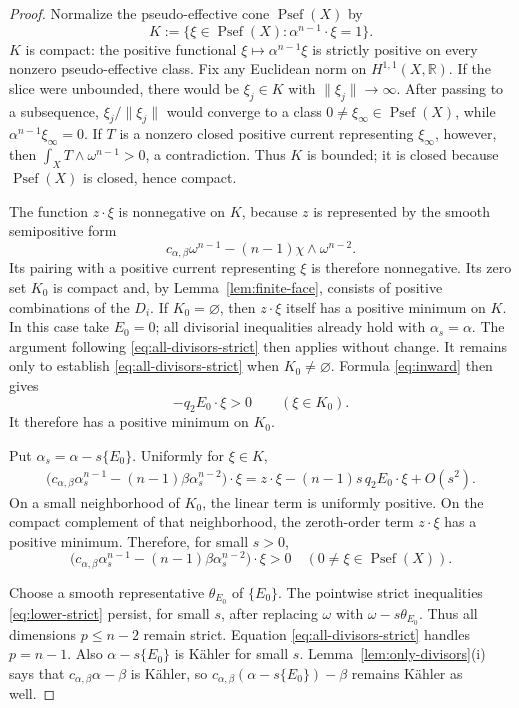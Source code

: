 \documentclass[reqno]{amsart}
\newcommand{\R}{\mathbb{R}}
\newcommand{\Psef}{\operatorname{Psef}}
\newcommand{\cab}{c_{\alpha,\beta}}
\theoremstyle{plain}
\theoremstyle{remark}
\begin{document}
\begin{proof}
Normalize the pseudo-effective cone $\Psef(X)$ by
\[
 K:=\{\xi\in\Psef(X):\alpha^{n-1}\cdot\xi=1\}.
\]
$K$ is compact: the positive functional
$\xi\mapsto\alpha^{n-1}\xi$ is strictly positive on every nonzero
pseudo-effective class.   Fix any Euclidean norm on $H^{1,1}(X,\R)$.  If the slice
were unbounded, there would be $\xi_j\in K$ with
$\|\xi_j\|\to\infty$.  After passing to a subsequence,
$\xi_j/\|\xi_j\|$ would converge to a class
$0\ne\xi_\infty\in\Psef(X)$, while
$\alpha^{n-1}\xi_\infty=0$.  If $T$ is a nonzero closed positive
current representing $\xi_\infty$, however, then
$\int_X T\wedge\omega^{n-1}>0$, a contradiction. Thus $K$ is
bounded; it is closed because $\Psef(X)$ is closed, hence compact.

The function $z\cdot\xi$ is nonnegative on $K$, because $z$ is
represented by the smooth semipositive form
\[
 \cab\omega^{n-1}-(n-1)\chi\wedge\omega^{n-2}.
\]
Its pairing with a positive current representing $\xi$ is therefore
nonnegative. Its zero set $K_0$ is compact and, by
Lemma~\ref{lem:finite-face}, consists of
positive combinations of the $D_i$.
If $K_0=\varnothing$, then $z\cdot\xi$ itself has a positive
minimum on $K$.  In this case take $E_0=0$;  all divisorial
inequalities already hold with $\alpha_s=\alpha$.  The argument following
\eqref{eq:all-divisors-strict} then applies without change. It remains
only to establish \eqref{eq:all-divisors-strict} when
$K_0\ne\varnothing$.
Formula \eqref{eq:inward} then gives
\[
 -q_2E_0\cdot\xi>0\qquad(\xi\in K_0).
\]
It therefore has a positive minimum on $K_0$.

Put $\alpha_s=\alpha-s\{E_0\}$.  Uniformly for $\xi\in K$,
\begin{align}
\bigl(\cab\alpha_s^{n-1}
 -(n-1)\beta\alpha_s^{n-2}\bigr)\cdot\xi=
z\cdot\xi-(n-1)s\,q_2E_0\cdot\xi+O(s^2).
\label{eq:wall-expansion}
\end{align}
On a small neighborhood of $K_0$, the linear term is uniformly
positive.  On the compact complement of that neighborhood, the
zeroth-order term $z\cdot\xi$ has a positive minimum.  Therefore,
for small $s>0$,
\begin{equation}\label{eq:all-divisors-strict}
 \bigl(\cab\alpha_s^{n-1}
 -(n-1)\beta\alpha_s^{n-2}\bigr)\cdot\xi>0
 \quad(0\ne\xi\in\Psef(X)).
\end{equation}


Choose a smooth representative $\theta_{E_0}$ of $\{E_0\}$.
The pointwise strict inequalities \eqref{eq:lower-strict} persist, for
small $s$, after replacing $\omega$ with
$\omega-s\theta_{E_0}$.  Thus all dimensions $p\leq n-2$ remain
strict.  Equation \eqref{eq:all-divisors-strict} handles $p=n-1$.
Also $\alpha-s\{E_0\}$ is K\"ahler for small $s$.
Lemma~\ref{lem:only-divisors}\textup{(i)} says that
$\cab\alpha-\beta$ is K\"ahler,
so $\cab(\alpha-s\{E_0\})-\beta$ remains K\"ahler as well.


\end{proof}
\end{document}
